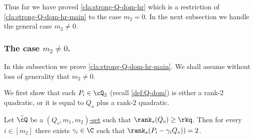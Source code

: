 Thus far we have proved  \autoref{cla:strong-Q-dom-hr} which is a restriction of  \autoref{cla:strong-Q-dom-hr-main} to the case $m_2=0$. In the next subsection we handle the general case $m_2\neq 0$.

\subsubsection{The case $m_2\neq 0$.}

In this subsection we prove  \autoref{cla:strong-Q-dom-hr-main}.
We shall assume  without loss of generality that $m_2\neq 0$.

We first show that each $P_i \in \cQ_2$ (recall \autoref{def:Q-dom}) is either a rank-$2$ quadratic, or it is equal to $Q_o$ plus a rank-$2$ quadratic.

\begin{claim}\label{cla:no-rank-3}
Let $\tilde{\cQ}$ be a \hyperref[def:Q-dom]{$(Q_o,m_1,m_2)$-set} such that $\rank_s(Q_o)\geq \rkq$. Then for every $i \in [m_2]$ there exists $\gamma_i\in \C$  such that $\rank_s(P_i-\gamma_i Q_o)) = 2$.
\end{claim}

